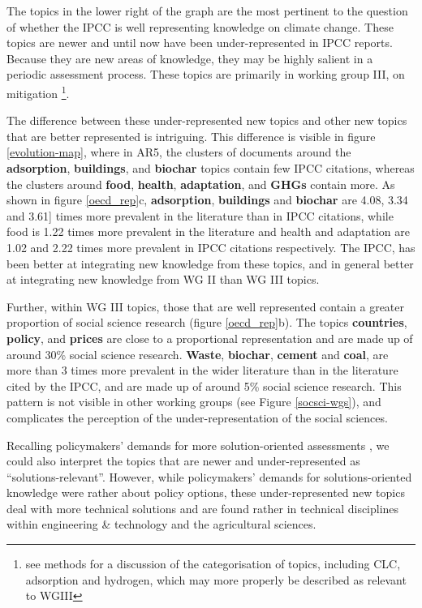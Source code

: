 \documentclass{article}
\begin{document}
\begin{linenumbers}
		The topics in the lower right of the graph are the most pertinent to the question of whether the IPCC is well representing knowledge on climate change. These topics are newer and until now have been under-represented in IPCC reports. Because they are new areas of knowledge, they may be highly salient in a periodic assessment process. These topics are primarily in working group III, on mitigation \footnote{see methods for a discussion of the categorisation of topics, including CLC, adsorption and hydrogen, which may more properly be described as relevant to WGIII}.
		
		
		The difference between these under-represented new topics and other new topics that are better represented is intriguing. This difference is visible in figure \ref{evolution-map}, where in AR5, the clusters of documents around the \textbf{adsorption}, \textbf{buildings}, and \textbf{biochar} topics contain few IPCC citations, whereas the clusters around \textbf{food}, \textbf{health}, \textbf{adaptation}, and \textbf{GHGs} contain more. As shown in figure \ref{oecd_rep}c, \textbf{adsorption}, \textbf{buildings} and \textbf{biochar} are 4.08, 3.34 and 3.61] times more prevalent in the literature than in IPCC citations, while food is 1.22 times more prevalent in the literature and health and adaptation are 1.02 and 2.22 times more prevalent in IPCC citations respectively. The IPCC, has been better at integrating new knowledge from these topics, and in general better at integrating new knowledge from WG II  than WG III topics.
		
		Further, within WG III topics, those that are well represented contain a greater proportion of social science research (figure \ref{oecd_rep}b). The topics \textbf{countries}, \textbf{policy}, and \textbf{prices} are close to a proportional representation and are made up of around 30\% social science research. \textbf{Waste}, \textbf{biochar}, \textbf{cement} and \textbf{coal}, are more than 3 times more prevalent in the wider literature than in the literature cited by the IPCC, and are made up of around 5\% social science research. This pattern is not visible in other working groups (see Figure \ref{socsci-wgs}), and complicates the perception of the under-representation of the social sciences.
		
		
		Recalling policymakers' demands for more solution-oriented assessments \cite{Kowarsch2017}, we could also interpret the topics that are newer and under-represented as ``solutions-relevant''. However, while policymakers' demands for solutions-oriented knowledge were rather about policy options, these under-represented new topics deal with more technical solutions and are found rather in technical disciplines within engineering \& technology and the agricultural sciences.
		

\end{linenumbers}
\end{document}

